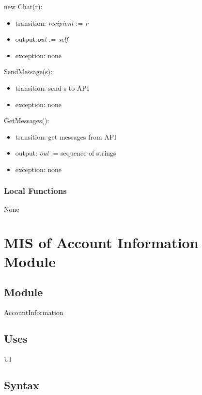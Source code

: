 \documentclass[12pt, titlepage]{article}
\begin{document}
\noindent new Chat(r):
\begin{itemize}
\item transition: \textit{recipient} := \textit{r}
\item output:\textit{out} := \textit{self}
\item exception: none
\end{itemize}

\noindent SendMessage(s):
\begin{itemize}
\item transition: send s to API
\item exception: none
\end{itemize}

\noindent GetMessages():
\begin{itemize}
\item transition: get messages from API
\item output: \textit{out} := sequence of strings
\item exception: none
\end{itemize}

\subsubsection{Local Functions}

None

\newpage

\section{MIS of Account Information Module} \label{mAccountInfo} 



\subsection{Module}

AccountInformation

\subsection{Uses}

UI

\subsection{Syntax}
\end{document}
